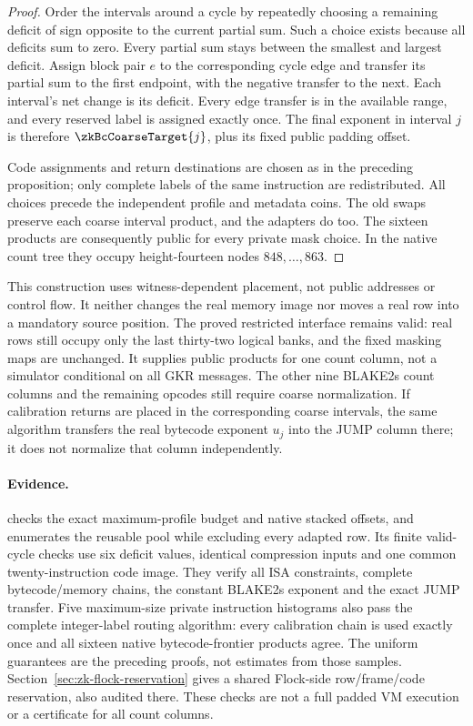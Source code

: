 \begin{proof}
Order the intervals around a cycle by repeatedly choosing a remaining deficit of sign opposite to the current partial sum. Such a choice exists because all deficits sum to zero. Every partial sum stays between the smallest and largest deficit. Assign block pair $e$ to the corresponding cycle edge and transfer its partial sum to the first endpoint, with the negative transfer to the next. Each interval's net change is its deficit. Every edge transfer is in the available range, and every reserved label is assigned exactly once. The final exponent in interval $j$ is therefore $\zkBcCoarseTarget{j}$, plus its fixed public padding offset.

Code assignments and return destinations are chosen as in the preceding proposition; only complete labels of the same instruction are redistributed. All choices precede the independent profile and metadata coins. The old swaps preserve each coarse interval product, and the adapters do too. The sixteen products are consequently public for every private mask choice. In the native count tree they occupy height-fourteen nodes $848,\ldots,863$.
\end{proof}

This construction uses witness-dependent placement, not public addresses or control flow. It neither changes the real memory image nor moves a real row into a mandatory source position. The proved restricted interface remains valid: real rows still occupy only the last thirty-two logical banks, and the fixed masking maps are unchanged. It supplies public products for one count column, not a simulator conditional on all GKR messages. The other nine BLAKE2s count columns and the remaining opcodes still require coarse normalization. If calibration returns are placed in the corresponding coarse intervals, the same algorithm transfers the real bytecode exponent $u_j$ into the JUMP column there; it does not normalize that column independently.

\paragraph{Evidence.}  checks the exact maximum-profile budget and native stacked offsets, and enumerates the reusable pool while excluding every adapted row. Its finite valid-cycle checks use six deficit values, identical compression inputs and one common twenty-instruction code image. They verify all ISA constraints, complete bytecode/memory chains, the constant BLAKE2s exponent and the exact JUMP transfer. Five maximum-size private instruction histograms also pass the complete integer-label routing algorithm: every calibration chain is used exactly once and all sixteen native bytecode-frontier products agree. The uniform guarantees are the preceding proofs, not estimates from those samples. Section~\ref{sec:zk-flock-reservation} gives a shared Flock-side row/frame/code reservation, also audited there. These checks are not a full padded VM execution or a certificate for all count columns.
